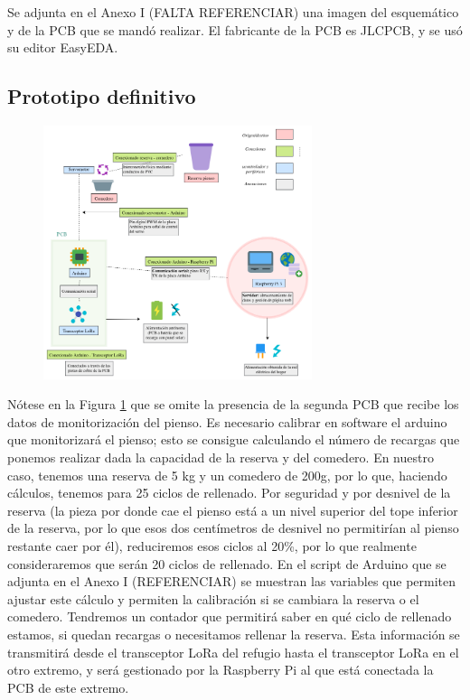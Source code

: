 \documentclass[12pt]{article}
\begin{document}
	\noindent Se adjunta en el Anexo I (FALTA REFERENCIAR) una imagen del esquemático y de la PCB que se mandó realizar. El fabricante de la PCB es JLCPCB, y se usó su editor EasyEDA. \\
	
	\subsection[Prototipo definitivo]{Prototipo definitivo}
	
	\pagebreak
	
		\begin{figure}[h]
		\begin{center}
			\includegraphics[width=0.7\textwidth]{img/conexiones tfg-comedero.png}
			\caption{}
			\label{Conexiones TFG comedero.}
		\end{center}
	\end{figure}
	
	\noindent Nótese en la Figura \ref{Conexiones TFG comedero.} que se omite la presencia de la segunda PCB que recibe los datos de monitorización del pienso.  Es necesario calibrar en software el arduino que monitorizará el pienso; esto se consigue calculando el número de recargas que ponemos realizar dada la capacidad de la reserva y del comedero. En nuestro caso, tenemos una reserva de 5 kg y un comedero de 200g, por lo que, haciendo cálculos, tenemos para 25 ciclos de rellenado. Por seguridad y por desnivel de la reserva (la pieza por donde cae el pienso está a un nivel superior del tope inferior de la reserva, por lo que esos dos centímetros de desnivel no permitirían al pienso restante caer por él), reduciremos esos ciclos al 20\%, por lo que realmente consideraremos que serán 20 ciclos de rellenado. En el script de Arduino que se adjunta en el Anexo I (REFERENCIAR)  se muestran las variables que permiten ajustar este cálculo y permiten la calibración si se cambiara la reserva o el comedero. Tendremos un contador que permitirá saber en qué ciclo de rellenado estamos, si quedan recargas o necesitamos rellenar la reserva. Esta información se transmitirá desde el transceptor LoRa del refugio hasta el transceptor LoRa en el otro extremo, y será gestionado por la Raspberry Pi al que está conectada la PCB de este extremo.\\ 
	
\end{document}
